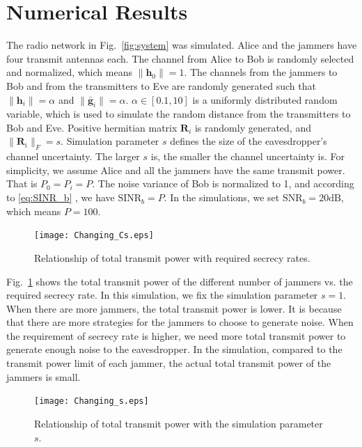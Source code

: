 \documentclass[conference]{IEEEtran}
\begin{document}
\section{Numerical Results} \label{sec:numerical results}
The radio network in Fig.~\ref{fig:system} was simulated. Alice and the jammers have four transmit antennas each. The channel from Alice to Bob is randomly selected and normalized, which means $\|\mathbf{h}_0\| = 1$. The channels from the jammers to Bob and from the transmitters to Eve are randomly generated such that $\|\mathbf{h}_i\| = \alpha$ and $\|\bar{\mathbf{g}}_i\| = \alpha$. $\alpha \in  [0.1,10]$ is a uniformly distributed random variable, which is used to simulate the random distance from the transmitters to Bob and Eve. Positive hermitian matrix $\mathbf{R}_i$ is randomly generated, and $\|\mathbf{R}_i\|_F = s$. Simulation parameter $s$ defines the size of the eavesdropper's channel uncertainty. The larger $s$ is, the smaller the channel uncertainty is. 
For simplicity, we assume Alice and all the jammers have the same transmit power. That is $P_0=P_i = P$. The noise variance of Bob is normalized to 1,  and according to \eqref{eq:SINR_b} , we have $\mathrm{SINR}_b = P$. In the simulations, we set $\mathrm{SNR}_b = 20 \mathrm{dB}$, which means $P = 100$.


\begin{figure}[!ht]
	\centering
	\texttt{[image: Changing\_Cs.eps]} %
	\caption{Relationship of total transmit power with required secrecy rates.}
	\label{fig:Changing_Cs}
\end{figure}

Fig.~\ref{fig:Changing_Cs} shows the total transmit power of the different number of jammers vs. the required secrecy rate. In this simulation, we fix the simulation parameter $s = 1$. When there are more jammers, the total transmit power is lower. It is because that there are more strategies for the jammers to choose to generate noise. When the requirement of secrecy rate is higher, we need more total transmit power to generate enough noise to the eavesdropper. In the simulation, compared to the transmit power limit of each jammer, the actual total transmit power of the jammers is small. %

\begin{figure}[!ht]
	\centering
	\texttt{[image: Changing\_s.eps]} %
	\caption{Relationship of total transmit power with the simulation parameter $s$.}
	\label{fig:Changing_s}
\end{figure}
\end{document}
